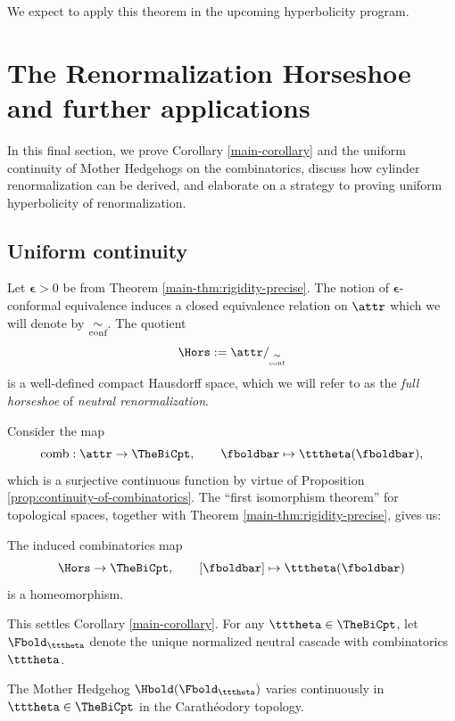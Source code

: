 \documentclass{amsart}
\begin{document}
We expect to apply this theorem in the upcoming hyperbolicity program.

\section{The Renormalization Horseshoe and further applications}
\label{sec:horseshoe}

In this final section, we prove Corollary \ref{main-corollary} and the uniform continuity of Mother Hedgehogs on the combinatorics, discuss how cylinder renormalization can be derived, and elaborate on a strategy to proving uniform hyperbolicity of renormalization.

\subsection{Uniform continuity}
\label{ss:uniform-continuity}

Let $\boldsymbol{\epsilon}>0$ be from Theorem \ref{main-thm:rigidity-precise}.
The notion of $\boldsymbol{\epsilon}$-conformal equivalence induces a closed equivalence relation on $\attr$ which we will denote by $\underset{\textnormal{conf}}{\sim}$.
The quotient
\[
    \Hors := \attr/_{\underset{\textnormal{conf}}{\sim}}
\]
is a well-defined compact Hausdorff space, which we will refer to as the 
\emph{full horseshoe} of \emph{neutral renormalization}.

Consider the map
    \[
        \textnormal{comb} : \attr \to \TheBiCpt, \qquad \fboldbar \mapsto \tttheta(\fboldbar),
    \]
which is a surjective continuous function by virtue of Proposition \ref{prop:continuity-of-combinatorics}.
The ``first isomorphism theorem'' for topological spaces, together with Theorem \ref{main-thm:rigidity-precise}, gives us:

\begin{corollary}
    The induced combinatorics map
    \[
    \Hors \to \TheBiCpt, \qquad [\fboldbar] \mapsto \tttheta(\fboldbar)
    \]
    is a homeomorphism.
\end{corollary}

This settles Corollary \ref{main-corollary}.
For any $\tttheta \in \TheBiCpt$, let $\Fbold_{\tttheta}$ denote the unique normalized neutral cascade with combinatorics $\tttheta$.

\begin{proposition}
\label{prop:uniform-continuity}
    The Mother Hedgehog $\Hbold(\Fbold_{\tttheta})$ varies continuously in $\tttheta \in \TheBiCpt$ in the Carath\'eodory topology.
\end{proposition}
\end{document}
